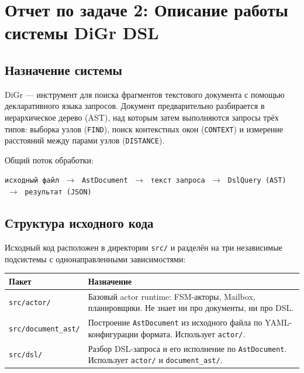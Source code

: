 \documentclass[a4paper,12pt]{article}
\begin{document}
\section{Отчет по задаче 2: Описание работы системы DiGr DSL}

\subsection{Назначение системы}

DiGr --- инструмент для поиска фрагментов текстового документа с помощью декларативного языка запросов. Документ предварительно разбирается в иерархическое дерево (AST), над которым затем выполняются запросы трёх типов: выборка узлов (\texttt{FIND}), поиск контекстных окон (\texttt{CONTEXT}) и измерение расстояний между парами узлов (\texttt{DISTANCE}).

Общий поток обработки:

\begin{center}
\texttt{исходный файл} $\;\rightarrow\;$ \texttt{AstDocument} $\;\rightarrow\;$ \texttt{текст запроса} $\;\rightarrow\;$ \texttt{DslQuery (AST)} $\;\rightarrow\;$ \texttt{результат (JSON)}
\end{center}

\subsection{Структура исходного кода}

Исходный код расположен в директории \texttt{src/} и разделён на три независимые подсистемы с однонаправленными зависимостями:

\begin{table}[h!]
\centering
\small
\begin{tabularx}{\textwidth}{lX}
\toprule
\textbf{Пакет}              & \textbf{Назначение} \\
\midrule
\texttt{src/actor/}         & Базовый actor runtime: FSM-акторы, Mailbox, планировщики. Не знает ни про документы, ни про DSL. \\
\texttt{src/document\_ast/} & Построение \texttt{AstDocument} из исходного файла по YAML-конфигурации формата. Использует \texttt{actor/}. \\
\texttt{src/dsl/}           & Разбор DSL-запроса и его исполнение по \texttt{AstDocument}. Использует \texttt{actor/} и \texttt{document\_ast/}. \\
\bottomrule
\end{tabularx}
\end{table}
\end{document}
